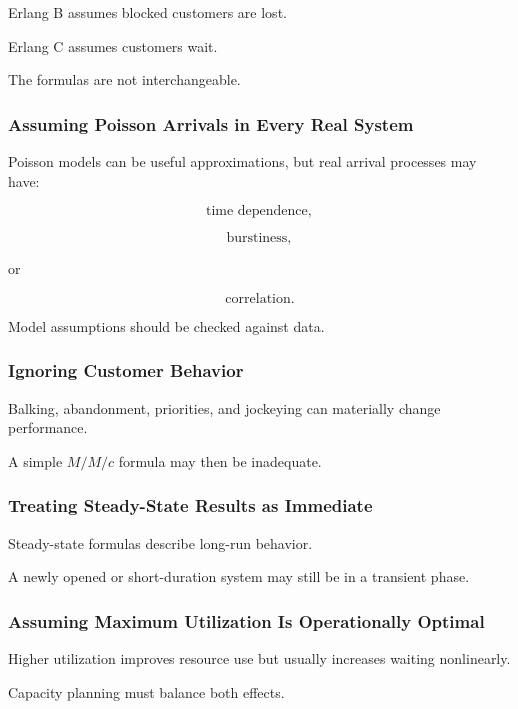 Erlang B assumes blocked customers are lost.

Erlang C assumes customers wait.

The formulas are not interchangeable.

\subsubsection{Assuming Poisson Arrivals in Every Real System}

Poisson models can be useful approximations, but real arrival processes may
have:

\[
\boxed{
\text{time dependence},
}
\]

\[
\boxed{
\text{burstiness},
}
\]

or

\[
\boxed{
\text{correlation}.
}
\]

Model assumptions should be checked against data.

\subsubsection{Ignoring Customer Behavior}

Balking, abandonment, priorities, and jockeying can materially change
performance.

A simple \(M/M/c\) formula may then be inadequate.

\subsubsection{Treating Steady-State Results as Immediate}

Steady-state formulas describe long-run behavior.

A newly opened or short-duration system may still be in a transient phase.

\subsubsection{Assuming Maximum Utilization Is Operationally Optimal}

Higher utilization improves resource use but usually increases waiting
nonlinearly.

Capacity planning must balance both effects.

